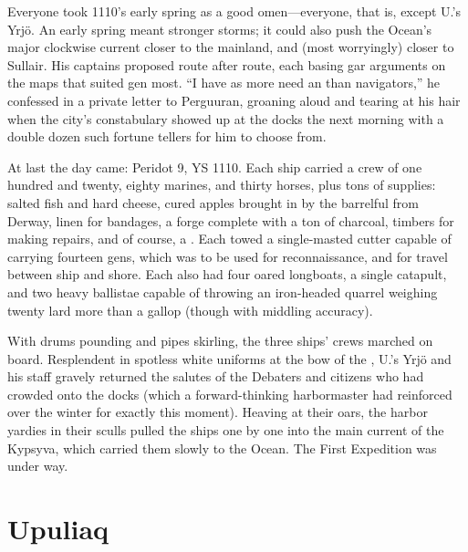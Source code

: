 \documentclass[12pt]{report}
\begin{document}
Everyone took 1110's early spring as a good omen---everyone, that is,
except U.'s Yrj\"{o}.  An early spring meant stronger storms; it could
also push the Ocean's major clockwise current closer to the mainland,
and (most worryingly) closer to Sullair.  His captains proposed route
after route, each basing gar arguments on the maps that suited gen
most.  ``I have as more need an  than navigators,'' he
confessed in a private letter to Perguuran, groaning aloud and tearing
at his hair when the city's constabulary showed up at the docks the
next morning with a double dozen such fortune tellers for him to
choose from.

At last the day came: Peridot 9, YS 1110.  Each ship carried a crew of
one hundred and twenty, eighty marines, and thirty horses, plus tons
of supplies: salted fish and hard cheese, cured apples brought in by
the barrelful from Derway, linen for bandages, a forge complete with a
ton of charcoal, timbers for making repairs, and of course, a
.  Each towed a single-masted cutter capable of
carrying fourteen gens, which was to be used for reconnaissance, and
for travel between ship and shore.  Each also had four oared
longboats, a single catapult, and two heavy ballistae capable of
throwing an iron-headed quarrel weighing twenty lard more than a
gallop (though with middling accuracy).

With drums pounding and pipes skirling, the three ships' crews marched
on board.  Resplendent in spotless white uniforms at the bow of the
, U.'s Yrj\"{o} and his staff gravely returned
the salutes of the Debaters and citizens who had crowded onto the
docks (which a forward-thinking harbormaster had reinforced over the
winter for exactly this moment).  Heaving at their oars, the harbor
yardies in their sculls pulled the ships one by one into the main
current of the Kypsyva, which carried them slowly to the Ocean.  The
First Expedition was under way.

\chapter{Upuliaq}


\end{document}
